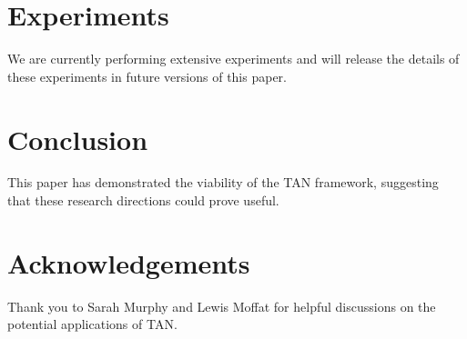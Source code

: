 \documentclass{article}
\begin{document}
\section{Experiments}
We are currently performing extensive experiments and will release the details of these experiments in future versions of this paper.
\section{Conclusion}
This paper has demonstrated the viability of the TAN framework, suggesting that these research directions could prove useful.

\section*{Acknowledgements}
Thank you to Sarah Murphy and Lewis Moffat for helpful discussions on the potential applications of TAN.




%
\end{document}
